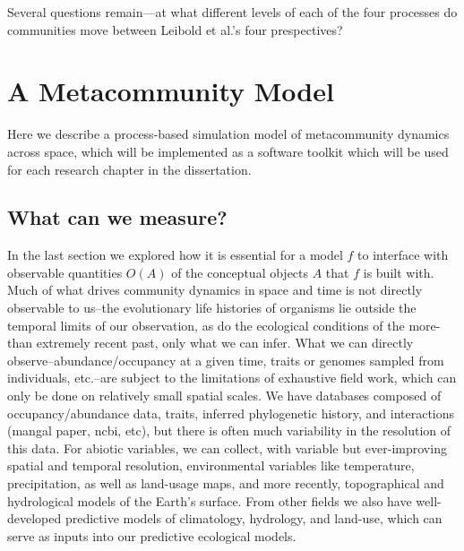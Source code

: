 \documentclass[]{article}
\begin{document}
Several questions remain---at what different levels of each of the four
processes do communities move between Leibold et al.'s four
prespectives?



%
%
%

\hypertarget{a-metacommunity-model}{%
\section{A Metacommunity Model}\label{a-metacommunity-model}}

Here we describe a process-based simulation model of metacommunity
dynamics across space, which will be implemented as a software toolkit
which will be used for each research chapter in the dissertation.


\hypertarget{what-can-we-measure}{%
\subsection{What can we measure?}\label{what-can-we-measure}}

In the last section we explored how it is essential for a model \(f\) to
interface with observable quantities \(O(A)\) of the conceptual objects
\(A\) that \(f\) is built with. Much of what drives community dynamics
in space and time is not directly observable to us--the evolutionary
life histories of organisms lie outside the temporal limits of our
observation, as do the ecological conditions of the more-than extremely
recent past, only what we can infer. What we can directly
observe--abundance/occupancy at a given time, traits or genomes sampled
from individuals, etc.--are subject to the limitations of exhaustive
field work, which can only be done on relatively small spatial scales.
We have databases composed of occupancy/abundance data, traits, inferred
phylogenetic history, and interactions (mangal paper, ncbi, etc), but
there is often much variability in the resolution of this data. For
abiotic variables, we can collect, with variable but ever-improving
spatial and temporal resolution, environmental variables like
temperature, precipitation, as well as land-usage maps, and more
recently, topographical and hydrological models of the Earth's surface.
From other fields we also have well-developed predictive models of
climatology, hydrology, and land-use, which can serve as inputs into our
predictive ecological models.
\end{document}
